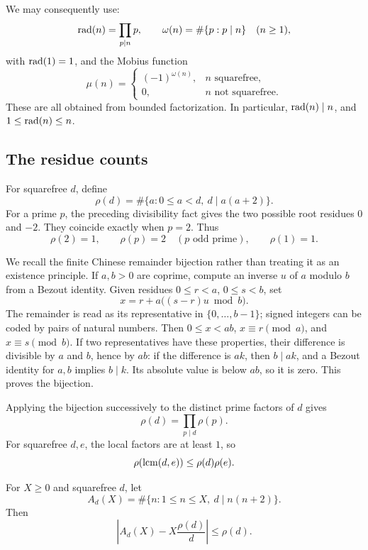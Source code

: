 We may consequently use:
\[
 \operatorname{rad}(n)=\prod_{p\mid n}p,\qquad
 \omega(n)=\#\{p:p\mid n\}
 \quad(n\ge1),
\]
with \(\operatorname{rad}(1)=1\), and the Mobius function
\[
 \mu(n)=
 \begin{cases}
 (-1)^{\omega(n)},&n\text{ squarefree},\\
 0,&n\text{ not squarefree}.
 \end{cases}
\]
These are all obtained from bounded factorization. In particular,
\(\operatorname{rad}(n)\mid n\), and \(1\le\operatorname{rad}(n)\le n\).

\subsection{The residue counts}

For squarefree \(d\), define
\[
 \rho(d)=\#\{a:0\le a<d,\ d\mid a(a+2)\}.
\]
For a prime \(p\), the preceding divisibility fact gives the two possible
root residues \(0\) and \(-2\). They coincide exactly when \(p=2\).
Thus
\begin{equation}
 \rho(2)=1,\qquad
 \rho(p)=2\quad(p\text{ odd prime}),\qquad
 \rho(1)=1.
 \label{eq:local-rho}
\end{equation}

We recall the finite Chinese remainder bijection rather than treating it
as an existence principle. If \(a,b>0\) are coprime, compute an inverse
\(u\) of \(a\) modulo \(b\) from a Bezout identity. Given residues
\(0\le r<a\), \(0\le s<b\), set
\[
 x=r+a\bigl((s-r)u\bmod b\bigr).
\]
The remainder is read as its representative in \(\{0,\ldots,b-1\}\);
signed integers can be coded by pairs of natural numbers.
Then \(0\le x<ab\), \(x\equiv r\pmod a\), and \(x\equiv s\pmod b\).
If two representatives have these properties, their difference is
divisible by \(a\) and \(b\), hence by \(ab\): if the difference is \(ak\),
then \(b\mid ak\), and a Bezout identity for \(a,b\) implies \(b\mid k\).
Its absolute value is below \(ab\), so it is zero. This proves the bijection.

Applying the bijection successively to the distinct prime factors of \(d\)
gives
\begin{equation}
 \rho(d)=\prod_{p\mid d}\rho(p).
 \label{eq:rho-product}
\end{equation}
For squarefree \(d,e\), the local factors are at least \(1\), so
\begin{equation}
 \rho(\operatorname{lcm}(d,e))\le\rho(d)\rho(e).
 \label{eq:rho-lcm}
\end{equation}

\begin{lemma}
\label{lem:count-error}
For \(X\ge0\) and squarefree \(d\), let
\[
 A_d(X)=\#\{n:1\le n\le X,\ d\mid n(n+2)\}.
\]
Then
\begin{equation}
 \left|A_d(X)-X\frac{\rho(d)}d\right|\le\rho(d).
 \label{eq:count-error}
\end{equation}
\end{lemma}


